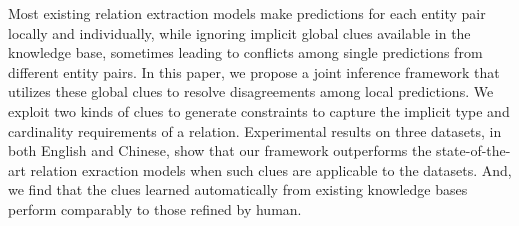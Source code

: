 Most existing relation extraction models make predictions for each entity pair locally and individually, while ignoring implicit global clues available in the knowledge base, sometimes leading to conflicts among single predictions from different entity pairs. In this paper, we propose a joint inference framework that utilizes these global clues to resolve disagreements among local predictions. We exploit two kinds of clues to generate constraints to capture the implicit type and cardinality requirements of a relation. Experimental results on three datasets, in both English and Chinese, show that our framework outperforms the state-of-the-art relation exraction models when such clues are applicable to the datasets. And, we find that the clues learned automatically from existing knowledge bases perform comparably to those refined by human.
